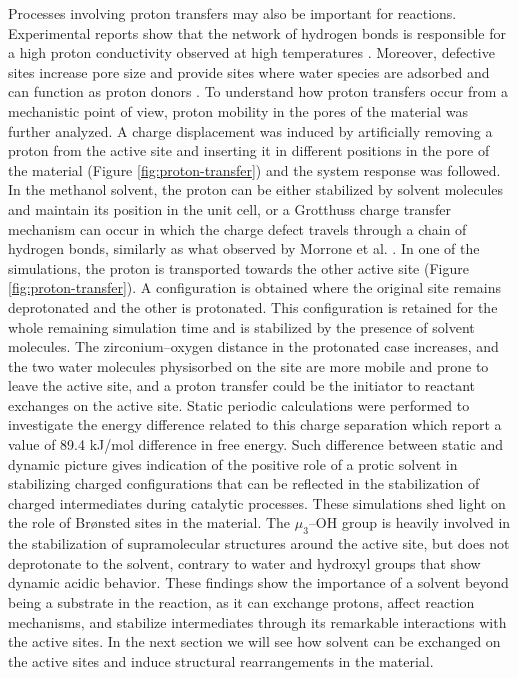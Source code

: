 Processes involving proton transfers may also be important for reactions. Experimental reports show that the network of hydrogen bonds is responsible for a high proton conductivity observed at high temperatures \cite{borges2016proton}. Moreover, defective sites increase pore size and provide sites where water species are adsorbed and can function as proton donors \cite{taylor2015defect}. To understand how proton transfers occur from a mechanistic point of view, proton mobility in the pores of the material was further analyzed. A charge displacement was induced by artificially removing a proton from the active site and inserting it in different positions in the pore of the material (Figure \ref{fig:proton-transfer}) and the system response was followed. In the methanol solvent, the proton can be either stabilized by solvent molecules and maintain its position in the unit cell, or a Grotthuss charge transfer mechanism can occur in which the charge defect travels through a chain of hydrogen bonds, similarly as what observed by Morrone et al. \cite{morrone2002ab}. In one of the simulations, the proton is transported towards the other active site (Figure \ref{fig:proton-transfer}). A configuration is obtained where the original site remains deprotonated and the other is protonated. This configuration is retained for the whole remaining simulation time and is stabilized by the presence of solvent molecules. The zirconium--oxygen distance in the protonated case increases, and the two water molecules physisorbed on the site are more mobile and prone to leave the active site, and a proton transfer could be the initiator to reactant exchanges on the active site. Static periodic calculations were performed to investigate the energy difference related to this charge separation which report a value of 89.4 kJ/mol difference in free energy. Such difference between static and dynamic picture gives indication of the positive role of a protic solvent in stabilizing charged configurations that can be reflected in the stabilization of charged intermediates during catalytic processes. These simulations shed light on the role of Br\o{}nsted sites in the material. The $\mu_3$--OH group is heavily involved in the stabilization of supramolecular structures around the active site, but does not deprotonate to the solvent, contrary to water and hydroxyl groups that show dynamic acidic behavior. These findings show the importance of a solvent beyond being a substrate in the reaction, as it can exchange protons, affect reaction mechanisms, and stabilize intermediates through its remarkable interactions with the active sites. In the next section we will see how solvent can be exchanged on the active sites and induce structural rearrangements in the material.

